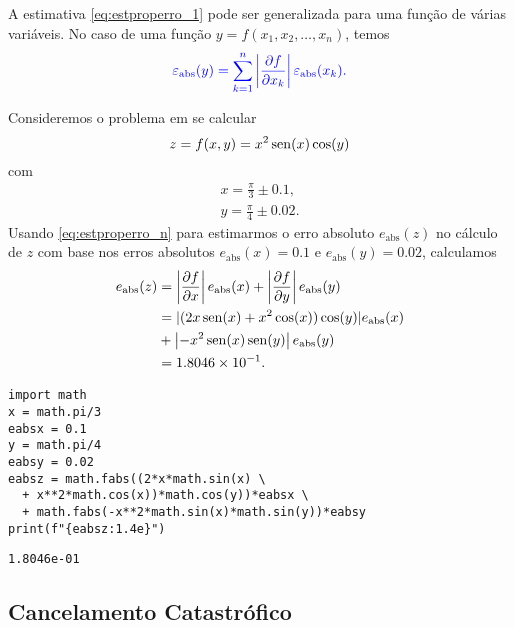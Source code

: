 A estimativa \eqref{eq:estproperro_1} pode ser generalizada para uma função de várias variáveis. No caso de uma função $y = f(x_1,x_2,\dotsc,x_n)$, temos
\begin{equation}\label{eq:estproperro_n}
  \color{blue}\varepsilon_{\text{abs}}(y) = \sum_{k=1}^n \left|\frac{\partial f}{\partial x_k}\right|\varepsilon_{\text{abs}}(x_k).
\end{equation}

\begin{ex}\label{ex:properro_2}
  Consideremos o problema em se calcular
  \begin{equation}
    z = f(x,y) = x^2\operatorname{sen}(x)\cos(y)
  \end{equation}
  com
  \begin{gather}
    x = \frac{\pi}{3} \pm 0.1,\\
    y = \frac{\pi}{4} \pm 0.02.
  \end{gather}
  Usando \eqref{eq:estproperro_n} para estimarmos o erro absoluto $e_{\text{abs}}(z)$ no cálculo de $z$ com base nos erros absolutos $e_{\text{abs}}(x)=0.1$ e $e_{\text{abs}}(y)=0.02$, calculamos
  \begin{align}
    e_{\text{abs}}(z) &= \left|\frac{\partial f}{\partial x}\right|e_{\text{abs}}(x) + \left|\frac{\partial f}{\partial y}\right|e_{\text{abs}}(y)\\
                      &= |(2x\operatorname{sen}(x) + x^2\cos(x))\cos(y)|e_{\text{abs}}(x)\\
                      &+ \left|-x^2\operatorname{sen}(x)\operatorname{sen}(y)\right|e_{\text{abs}}(y)\\
                      &= 1.8046\times 10^{-1}.
  \end{align}
  
  
\begin{lstlisting}
import math
x = math.pi/3
eabsx = 0.1
y = math.pi/4
eabsy = 0.02
eabsz = math.fabs((2*x*math.sin(x) \
  + x**2*math.cos(x))*math.cos(y))*eabsx \
  + math.fabs(-x**2*math.sin(x)*math.sin(y))*eabsy
print(f"{eabsz:1.4e}")
\end{lstlisting}

\begin{verbatim}
1.8046e-01    
\end{verbatim}

\end{ex}


\subsection{Cancelamento Catastrófico}

